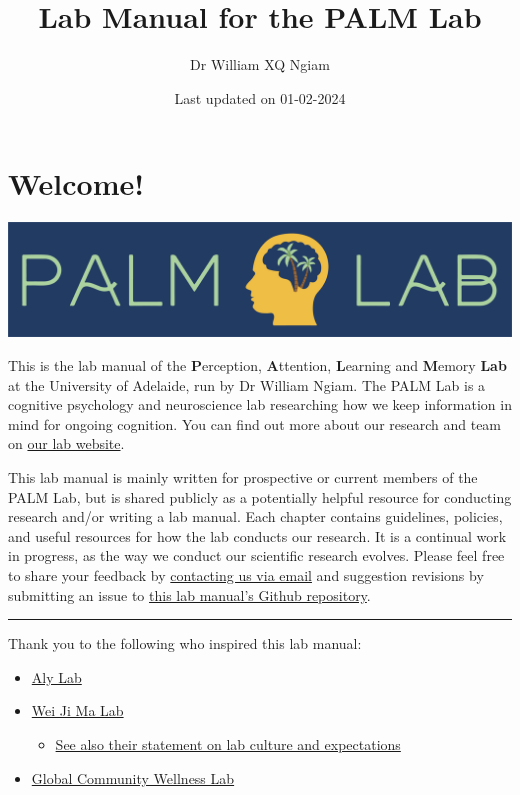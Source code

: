 \documentclass[
]{book}
\title{Lab Manual for the PALM Lab}
\author{Dr William XQ Ngiam}
\date{Last updated on 01-02-2024}
\providecommand{\tightlist}{%
  \setlength{\itemsep}{0pt}\setlength{\parskip}{0pt}}
\begin{document}
\maketitle

{
\setcounter{tocdepth}{1}
\tableofcontents
}
\hypertarget{welcome}{%
\chapter*{Welcome!}\label{welcome}}

\includegraphics{images/banner.png}

This is the lab manual of the \textbf{P}erception, \textbf{A}ttention, \textbf{L}earning and \textbf{M}emory \textbf{Lab} at the University of Adelaide, run by Dr William Ngiam. The PALM Lab is a cognitive psychology and neuroscience lab researching how we keep information in mind for ongoing cognition. You can find out more about our research and team on \href{https://palm-lab.github.io}{our lab website}.

This lab manual is mainly written for prospective or current members of the PALM Lab, but is shared publicly as a potentially helpful resource for conducting research and/or writing a lab manual. Each chapter contains guidelines, policies, and useful resources for how the lab conducts our research. It is a continual work in progress, as the way we conduct our scientific research evolves. Please feel free to share your feedback by \href{mailto:palm.laboratory@gmail.com}{contacting us via email} and suggestion revisions by submitting an issue to \href{https://github.com/PALM-lab/lab-manual/issues}{this lab manual's Github repository}.

\begin{center}\rule{0.5\linewidth}{0.5pt}\end{center}

Thank you to the following who inspired this lab manual:

\begin{itemize}
\tightlist
\item
  \href{https://github.com/alylab/labmanual/blob/master/aly-lab-manual.pdf}{Aly Lab}
\item
  \href{https://www.cns.nyu.edu/malab/lablife.html}{Wei Ji Ma Lab}

  \begin{itemize}
  \tightlist
  \item
    \href{https://docs.google.com/document/d/1f6foaCkHiCkPKjO0gdKkkdm2dn1EKn5xRKZv-Ut5Dg4/edit?usp=sharing}{See also their statement on lab culture and expectations}
  \end{itemize}
\item
  \href{https://bookdown.org/jordandanielsnyder/LabManual/expectations-and-responsiblities.html}{Global Community Wellness Lab}
\end{itemize}
\end{document}
